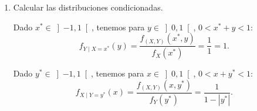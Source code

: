 \begin{ejercicio}
\begin{enumerate}
        Para $y\in \left]-1,0\right[$, ya que la función de densidad es constante, tenemos que:
        \begin{align*}
            f_Y(y) &= \int_{-\infty}^{+\infty} f(x, y) \, dx = \int_{-y}^{1} 1 \, dx = \left[x\right]_{-y}^{1} = 1+y.
        \end{align*}

        Por tanto, tenemos que, para $y\in \left]-1,1\right[$:
        \begin{equation*}
            f_Y(y) = 1-|y|.
        \end{equation*}

        \item Calcular las distribuciones condicionadas.
        
        Dado $x^\ast\in \left]-1,1\right[$, tenemos para $y\in \left]0,1\right[$, $0<x^\ast + y < 1$:
        \begin{equation*}
            f_{Y\mid X=x^\ast} (y) = \dfrac{f_{(X,Y)}(x^\ast, y)}{f_X(x^\ast)} = \dfrac{1}{1} = 1.
        \end{equation*}

        Dado $y^\ast\in \left]-1,1\right[$, tenemos para $x\in \left]0,1\right[$, $0<x+y^\ast<1$:
        \begin{equation*}
            f_{X\mid Y=y^\ast} (x) = \dfrac{f_{(X,Y)}(x, y^\ast)}{f_Y(y^\ast)} = \dfrac{1}{1-|y^\ast|}.
        \end{equation*}
    \end{enumerate}
\end{ejercicio}

